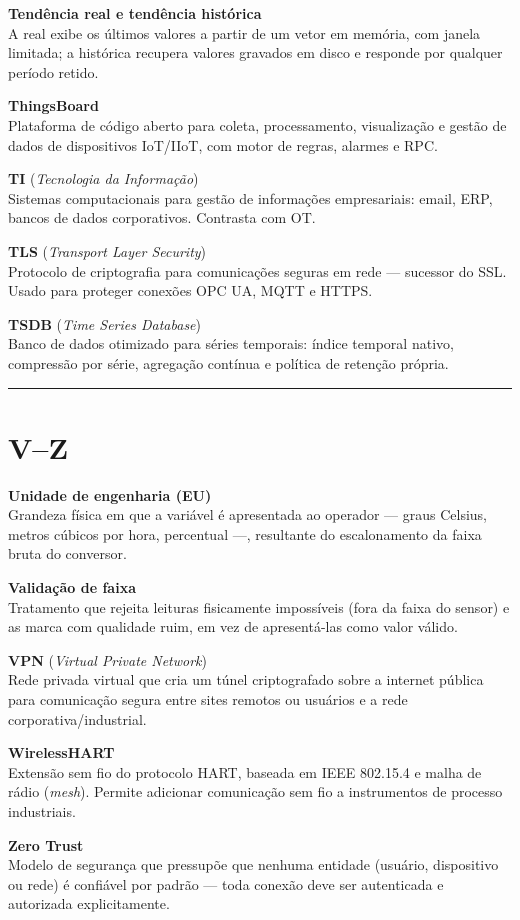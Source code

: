 \textbf{Tendência real e tendência histórica}\\
A real exibe os últimos valores a partir de um vetor em memória, com janela limitada; a histórica recupera valores gravados em disco e responde por qualquer período retido.

\textbf{ThingsBoard}\\
Plataforma de código aberto para coleta, processamento, visualização e gestão de dados de dispositivos IoT/IIoT, com motor de regras, alarmes e RPC.

\textbf{TI} (\emph{Tecnologia da Informação})\\
Sistemas computacionais para gestão de informações empresariais: email, ERP, bancos de dados corporativos. Contrasta com OT.

\textbf{TLS} (\emph{Transport Layer Security})\\
Protocolo de criptografia para comunicações seguras em rede --- sucessor do SSL. Usado para proteger conexões OPC UA, MQTT e HTTPS.

\textbf{TSDB} (\emph{Time Series Database})\\
Banco de dados otimizado para séries temporais: índice temporal nativo, compressão por série, agregação contínua e política de retenção própria.

\begin{center}\rule{0.5\linewidth}{0.5pt}\end{center}

\section{\texorpdfstring{V--Z}{VZ}}\label{vz}

\textbf{Unidade de engenharia (EU)}\\
Grandeza física em que a variável é apresentada ao operador --- graus Celsius, metros cúbicos por hora, percentual ---, resultante do escalonamento da faixa bruta do conversor.

\textbf{Validação de faixa}\\
Tratamento que rejeita leituras fisicamente impossíveis (fora da faixa do sensor) e as marca com qualidade ruim, em vez de apresentá-las como valor válido.

\textbf{VPN} (\emph{Virtual Private Network})\\
Rede privada virtual que cria um túnel criptografado sobre a internet pública para comunicação segura entre sites remotos ou usuários e a rede corporativa/industrial.

\textbf{WirelessHART}\\
Extensão sem fio do protocolo HART, baseada em IEEE 802.15.4 e malha de rádio (\emph{mesh}). Permite adicionar comunicação sem fio a instrumentos de processo industriais.

\textbf{Zero Trust}\\
Modelo de segurança que pressupõe que nenhuma entidade (usuário, dispositivo ou rede) é confiável por padrão --- toda conexão deve ser autenticada e autorizada explicitamente.

